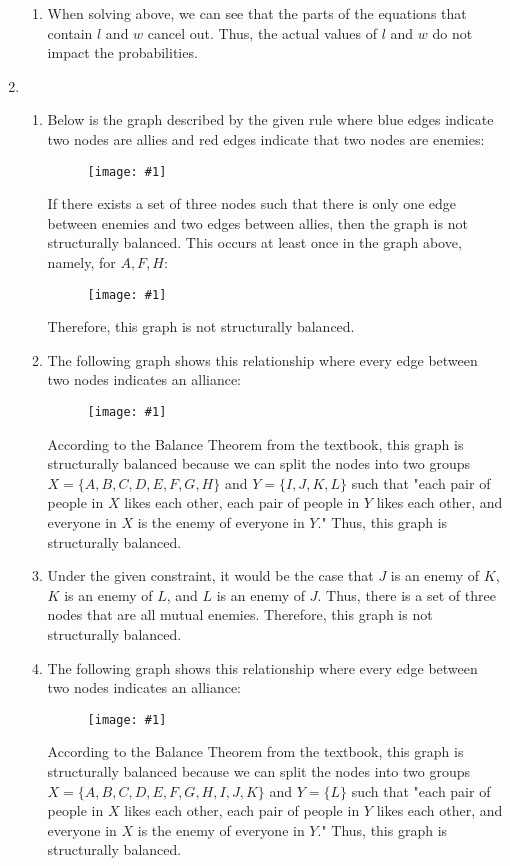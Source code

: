 \documentclass{article}
\newcommand{\image}[1]{\begin{figure}[H]
            \texttt{[image: \#1]}
            \centering
        \end{figure}}
\begin{document}
\begin{enumerate}
\begin{enumerate}
        \item When solving above, we can see that the parts of the equations that contain $l$ and $w$ cancel out. Thus, the actual values of $l$ and $w$ do not impact the probabilities.

\end{enumerate}

    \item 
    \begin{enumerate}
        \item Below is the graph described by the given rule where blue edges indicate two nodes are allies and red edges indicate that two nodes are enemies: 
        \image{assets/q5a.png}
        If there exists a set of three nodes such that there is only one edge between enemies and two edges between allies, then the graph is not structurally balanced. This occurs at least once in the graph above, namely, for $A,F,H$:

        \image{assets/q5a2.png}

        Therefore, this graph is not structurally balanced.
        \pagebreak

        \item The following graph shows this relationship where every edge between two nodes indicates an alliance:
        
        \image{assets/q5b.png}

        According to the Balance Theorem from the textbook, this graph is structurally balanced because we can split the nodes into two groups $X=\{A,B,C,D,E,F,G,H\}$ and $Y=\{I,J,K,L\}$ such that "each pair of people in $X$ likes each other, each pair of people in $Y$ likes each other, and everyone in $X$ is the enemy of everyone in $Y$." Thus, this graph is structurally balanced.

        \item Under the given constraint, it would be the case that $J$ is an enemy of $K$, $K$ is an enemy of $L$, and $L$ is an enemy of $J$. Thus, there is a set of three nodes that are all mutual enemies. Therefore, this graph is not structurally balanced.
        
        \pagebreak
        \item The following graph shows this relationship where every edge between two nodes indicates an alliance:
        \image{assets/q5d.png}

        According to the Balance Theorem from the textbook, this graph is structurally balanced because we can split the nodes into two groups $X=\{A,B,C,D,E,F,G,H,I,J,K\}$ and $Y=\{L\}$ such that "each pair of people in $X$ likes each other, each pair of people in $Y$ likes each other, and everyone in $X$ is the enemy of everyone in $Y$." Thus, this graph is structurally balanced.
    \end{enumerate}
\end{enumerate}
\end{document}
